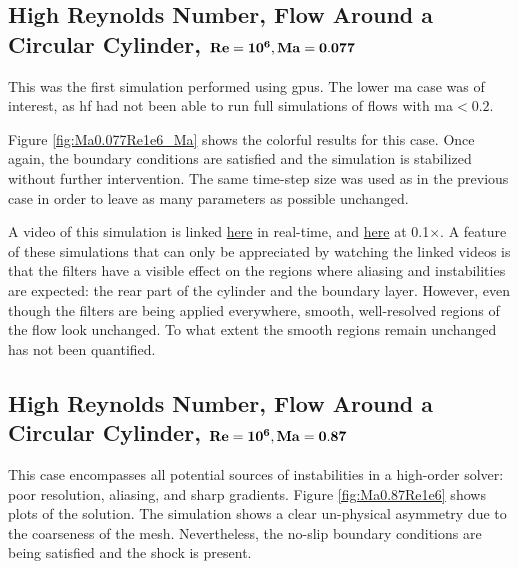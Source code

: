 \subsection{High Reynolds Number, Flow Around a Circular Cylinder, $\bf Re = 10^6, Ma = 0.077$}
This was the first simulation performed using \gls{gpu}s. The lower \gls{ma} case was of interest, as \gls{hf} had not been able to run full simulations of flows with \gls{ma}$< 0.2$.

Figure \ref{fig:Ma0.077Re1e6_Ma} shows the colorful results for this case. Once again, the boundary conditions are satisfied and the simulation is stabilized without further intervention. The same time-step size was used as in the previous case in order to leave as many parameters as possible unchanged.

A video of this simulation is linked \href{https://youtu.be/EymTVFzyPcA}{here} in real-time, and \href{https://youtu.be/8ZH349_GRUA}{here} at 0.1$\times$. A feature of these simulations that can only be appreciated by watching the linked videos is that the filters have a visible effect on the regions where aliasing and instabilities are expected: the rear part of the cylinder and the boundary layer. However, even though the filters are being applied everywhere, smooth, well-resolved regions of the flow look unchanged. To what extent the smooth regions remain unchanged has not been quantified.

\begin{figure*}
\hspace{-1cm}
\hfill
{}
\caption{Flow past a cylinder. \gls{re}$= 1e6$, \gls{ma} $= 0.077, p = 4$}
\label{fig:Ma0.077Re1e6_Ma}

\end{figure*}

%

\subsection{High Reynolds Number, Flow Around a Circular Cylinder, $\bf Re = 10^6, Ma = 0.87$}

This case encompasses all potential sources of instabilities in a high-order solver: poor resolution, aliasing, and sharp gradients. Figure \ref{fig:Ma0.87Re1e6} shows plots of the solution. The simulation shows a clear un-physical asymmetry due to the coarseness of the mesh. Nevertheless, the no-slip boundary conditions are being satisfied and the shock is present. 

